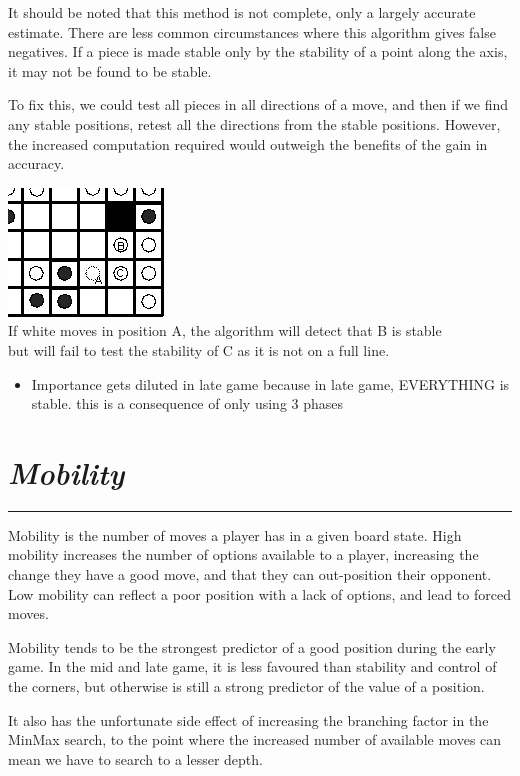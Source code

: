 \documentclass[10pt]{report}
\begin{document}
\begin{multicols}{2}
It should be noted that this method is not complete, only a largely accurate estimate. There are less common circumstances where this algorithm gives false negatives. If a piece is made stable only by the stability of a point along the axis, it may not be found to be stable.

To fix this, we could test all pieces in all directions of a move, and then if we find any stable positions, retest all the directions from the stable positions. However, the increased computation required would outweigh the benefits of the gain in accuracy.

\begin{center}
\includegraphics[scale=0.6]{falsepos.PNG}\\
If white moves in position A, the algorithm will detect that B is stable\\ but will fail to test the stability of C as it is not on a full line.
\end{center}

    \begin{itemize}
  \item
    Importance gets diluted in late game because in late game, EVERYTHING is stable. this is a consequence of only using 3 phases
  \end{itemize}
\section*{\emph{\textmd{Mobility}}}
\hrule

Mobility is the number of moves a player has in a given board state. High mobility increases the number of options available to a player, increasing the change they have a good move, and that they can out-position their opponent. Low mobility can reflect a poor position with a lack of options, and lead to forced moves.

Mobility tends to be the strongest predictor of a good position during the early game. In the mid and late game, it is less favoured than stability and control of the corners, but otherwise is still a strong predictor of the value of a position.

It also has the unfortunate side effect of increasing the branching factor in the MinMax search, to the point where the increased number of available moves can mean we have to search to a lesser depth.

\end{multicols}
\end{document}
